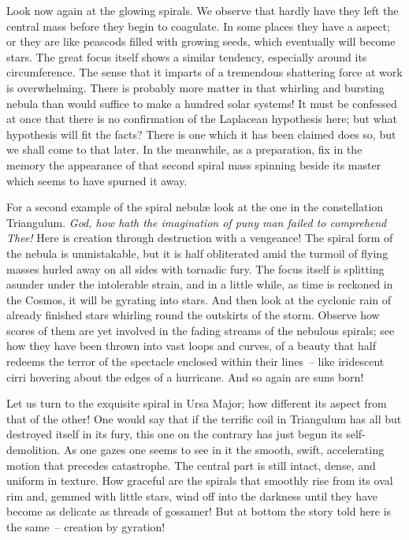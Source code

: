 Look now again at the glowing spirals. We observe that hardly have
they left the central mass before they begin to coagulate. In some
places they have a  aspect; or they are like peascods
filled with growing seeds, which eventually will become stars. The
great focus itself shows a similar tendency, especially around its
circumference. The sense that it imparts of a tremendous shattering
force at work is overwhelming. There is probably more matter in that
whirling and bursting nebula than would suffice to make a hundred
solar systems! It must be confessed at once that there is no
confirmation of the Laplacean hypothesis here; but what hypothesis
will fit the facts? There is one which it has been claimed does so,
but we shall come to that later. In the meanwhile, as a preparation,
fix in the memory the appearance of that second spiral mass spinning
beside its master which seems to have spurned it away.

For a second example of the spiral nebul{\ae} look at the one in the 
constellation Triangulum. {\em God, how hath the imagination of puny
man failed to comprehend Thee!} Here is creation through destruction
with a vengeance! The spiral form of the nebula is unmistakable, but
it is half obliterated amid the turmoil of flying masses hurled away
on all sides with tornadic fury. The focus itself is splitting asunder
under the intolerable strain, and in a little while, as time is
reckoned in the Cosmos, it will be gyrating into stars. And then look
at the cyclonic rain of already finished stars whirling round the
outskirts of the storm. Observe how scores of them are yet involved in
the fading streams of the nebulous spirals; see how they have been
thrown into vast loops and curves, of a beauty that half redeems the
terror of the spectacle enclosed within their lines~-- like iridescent
cirri hovering about the edges of a hurricane. And so again are suns
born!


Let us turn to the exquisite spiral in Ursa Major; how different its 
aspect from that of the other! One would say that if the terrific coil
in Triangulum has all but destroyed itself in its fury, this one on
the contrary has just begun its self-demolition. As one gazes one
seems to see in it the smooth, swift, accelerating motion that
precedes catastrophe. The central part is still intact, dense, and
uniform in texture. How graceful are the spirals that smoothly rise
from its oval rim and, gemmed with little stars, wind off into the
darkness until they have become as delicate as threads of gossamer!
But at bottom the story told here is the same~-- creation by gyration!

